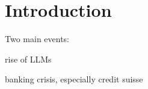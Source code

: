 \chapter{Introduction}\label{sec1}
\thispagestyle{empty}

Two main events:

rise of LLMs

banking crisis, especially credit suisse

\cleardoublepage
